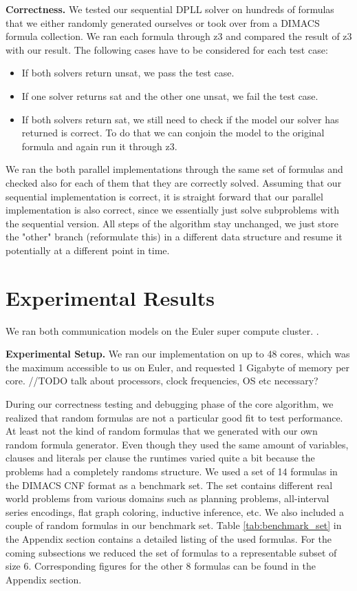 \documentclass[letterpaper]{article}
\newcommand{\mypar}[1]{{\bf #1.}}
\begin{document}
\mypar{Correctness}
We tested our sequential DPLL solver on hundreds of formulas that we either randomly generated ourselves or took over from a DIMACS formula collection. \cite{cnf_website}
We ran each formula through z3 \cite{z3} and compared the result of z3 with our result.
The following cases have to be considered for each test case:
\begin{itemize}
    \item If both solvers return unsat, we pass the test case.
    \item If one solver returns sat and the other one unsat, we fail the test case.
    \item If both solvers return sat, we still need to check if the model our solver has returned is correct.
        To do that we can conjoin the model to the original formula and again run it through z3.
\end{itemize}

We ran the both parallel implementations through the same set of formulas and checked also for each of them that they are correctly solved.
Assuming that our sequential implementation is correct, it is straight forward that our parallel implementation is also correct, since we essentially just solve subproblems with the sequential version.
All steps of the algorithm stay unchanged, we just store the "other" branch (reformulate this) in a different data structure and resume it potentially at a different point in time.


\section{Experimental Results}\label{sec:exp}

We ran both communication models on the Euler super compute cluster. \cite{euler}.

\mypar{Experimental Setup}
We ran our implementation on up to 48 cores, which was the maximum accessible to us on Euler, and requested 1 Gigabyte of memory per core.
//TODO talk about processors, clock frequencies, OS etc necessary?

During our correctness testing and debugging phase of the core algorithm, we realized that random formulas are not a particular good fit to test performance.
At least not the kind of random formulas that we generated with our own random formula generator.
Even though they used the same amount of variables, clauses and literals per clause the runtimes varied quite a bit because the problems had a completely randoms structure.
We used a set of 14 formulas in the DIMACS CNF format as a benchmark set.
The set contains different real world problems from various domains such as planning problems, all-interval series encodings, flat graph coloring, inductive inference, etc.
We also included a couple of random formulas in our benchmark set.
Table \ref{tab:benchmark_set} in the Appendix section contains a detailed listing of the used formulas.
For the coming subsections we reduced the set of formulas to a representable subset of size 6.
Corresponding figures for the other 8 formulas can be found in the Appendix section.
\end{document}
